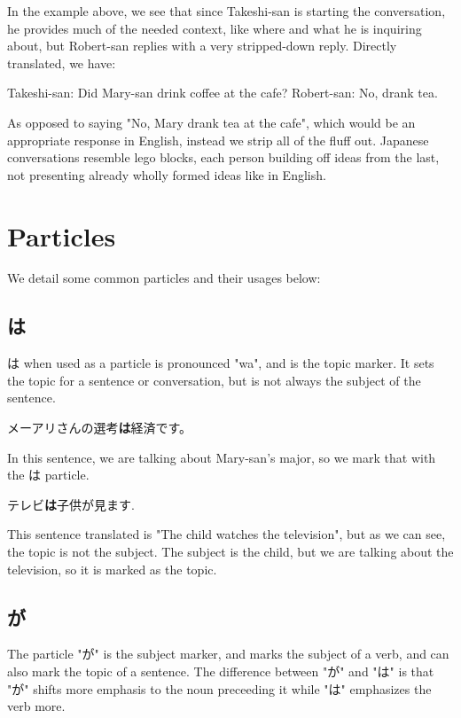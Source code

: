 \documentclass{article}
\begin{document}
\begin{CJK}{UTF8}{min}
In the example above, we see that since Takeshi-san is starting the conversation, he provides much of the needed context, like where and what he is inquiring about, but Robert-san replies with a very stripped-down reply. Directly translated, we have:

\begin{example}
Takeshi-san: Did Mary-san drink coffee at the cafe?
Robert-san: No, drank tea.
\end{example}

As opposed to saying "No, Mary drank tea at the cafe", which would be an appropriate response in English, instead we strip all of the fluff out. Japanese conversations resemble lego blocks, each person building off ideas from the last, not presenting already wholly formed ideas like in English. 

\section{Particles}
We detail some common particles and their usages below:

\subsection{は}
は when used as a particle is pronounced "wa", and is the topic marker. It sets the topic for a sentence or conversation, but is not always the subject of the sentence. 

\begin{example}
メーアリさんの選考\textbf{は}経済です。
\end{example}

In this sentence, we are talking about Mary-san's major, so we mark that with the は particle.

\begin{example}
    テレビ\textbf{は}子供が見ます.
\end{example}
This sentence translated is "The child watches the television", but as we can see, the topic is not the subject. The subject is the child, but we are talking about the television, so it is marked as the topic. 

\subsection{が}

The particle "が" is the subject marker, and marks the subject of a verb, and can also mark the topic of a sentence. The difference between "が" and "は" is that "が" shifts more emphasis to the noun preceeding it while "は" emphasizes the verb more.


\end{CJK}
\end{document}
